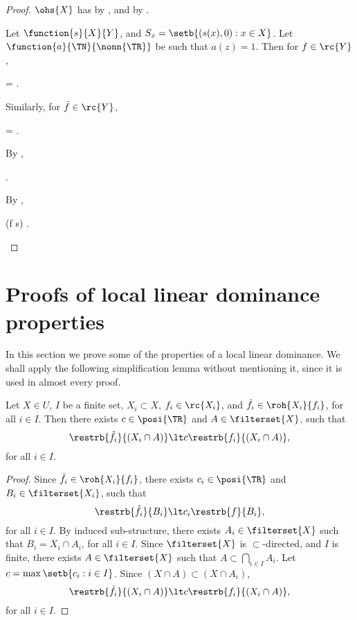 \documentclass[b5paper, english, oneside]{memoir}
\begin{document}
\begin{proof}
$\ohs{X}$ has  by , and  by . 

Let $\function{s}{X}{Y}$, and $S_x = \setb{(s(x), 0) : x \in X}$. Let $\function{a}{\TN}{\nonn{\TR}}$ be such that $a(z) = 1$. Then for $f \in \rc{Y}$,
\begin{eqs}
 = .
\end{eqs}
Similarly, for $\bar{f} \in \rc{Y}$,
\begin{eqs}
 = .
\end{eqs}
By ,
\begin{eqs}
 \subset {}.
\end{eqs}
By ,
\begin{eqs}
(f \circ s) \in {}.
\end{eqs}
\end{proof}

\chapter{Proofs of local linear dominance properties}
\label{ProofsForLocalLinearDominance}

In this section we prove some of the properties of a local linear dominance. We shall apply the following simplification lemma without mentioning it, since it is used in almost every proof.

\begin{lemma}
\label{LocalSingleConstantLemma}
Let $X \in U$, $I$ be a finite set, $X_i \subset X$, $f_i \in \rc{X_i}$, and $\hat{f}_i \in \roh{X_i}{f_i}$, for all $i \in I$. Then there exists $c \in \posi{\TR}$ and $A \in \filterset{X}$, such that
\begin{equation}
\restrb{\hat{f}_i}{(X_i \cap A)} \lt c \restrb{f_i}{(X_i \cap A)},
\end{equation}
for all $i \in I$.
\end{lemma}

\begin{proof}
Since $\hat{f}_i \in \roh{X_i}{f_i}$, there exists $c_i \in \posi{\TR}$ and $B_i \in \filterset{X_i}$, such that
\begin{equation}
\restrb{\hat{f}_i}{B_i} \lt c_i \restrb{f}{B_i},
\end{equation}
for all $i \in I$. By induced sub-structure, there exists $A_i \in \filterset{X}$ such that $B_i = X_i \cap A_i$, for all $i \in I$. Since $\filterset{X}$ is $\subset$-directed, and $I$ is finite, there exists $A \in \filterset{X}$ such that $A \subset \bigcap_{i \in I} A_i$. Let $c = \max \setb{c_i : i \in I}$. Since $(X \cap A) \subset (X \cap A_i)$,
\begin{equation}
\restrb{\hat{f}_i}{(X_i \cap A)} \lt c \restrb{f_i}{(X_i \cap A)},
\end{equation}
for all $i \in I$.
\end{proof}
\end{document}
